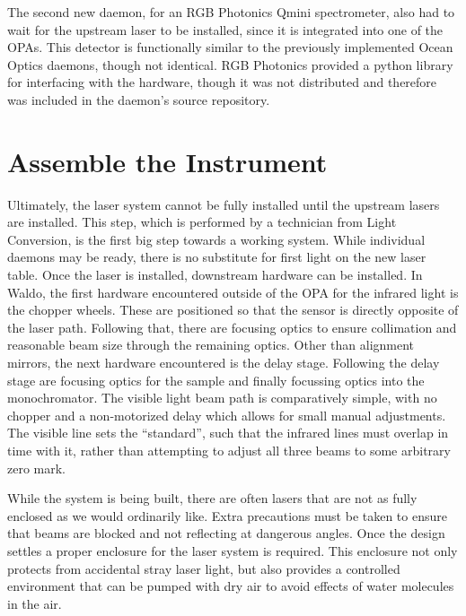 The second new daemon, for an RGB Photonics Qmini spectrometer\cite{broadcom_qmini}, also had to wait for the upstream laser to be installed, since it is integrated into one of the OPAs.
This detector is functionally similar to the previously implemented Ocean Optics daemons\cite{yaqd-ocean-optics}, though not identical.
RGB Photonics provided a python library for interfacing with the hardware, though it was not distributed and therefore was included in the daemon's source repository.

\clearpage

\section{Assemble the Instrument}  %

Ultimately, the laser system cannot be fully installed until the upstream lasers are installed.
This step, which is performed by a technician from Light Conversion, is the first big step towards a working system.
While individual daemons may be ready, there is no substitute for first light on the new laser table.
Once the laser is installed, downstream hardware can be installed.
In Waldo, the first hardware encountered outside of the OPA for the infrared light is the chopper wheels.
These are positioned so that the sensor is directly opposite of the laser path.
Following that, there are focusing optics to ensure collimation and reasonable beam size through the remaining optics.
Other than alignment mirrors, the next hardware encountered is the delay stage.
Following the delay stage are focusing optics for the sample and finally focussing optics into the monochromator.
The visible light beam path is comparatively simple, with no chopper and a non-motorized delay which allows for small manual adjustments.
The visible line sets the ``standard'', such that the infrared lines must overlap in time with it, rather than attempting to adjust all three beams to some arbitrary zero mark.

While the system is being built, there are often lasers that are not as fully enclosed as we would ordinarily like.
Extra precautions must be taken to ensure that beams are blocked and not reflecting at dangerous angles.
Once the design settles a proper enclosure for the laser system is required.
This enclosure not only protects from accidental stray laser light, but also provides a controlled environment that can be pumped with dry air to avoid effects of water molecules in the air.

